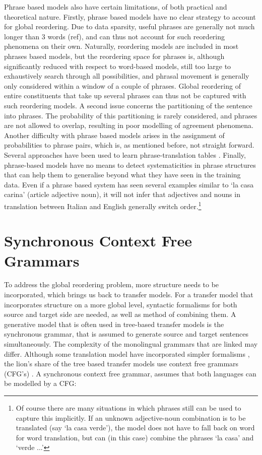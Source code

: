 \documentclass{report}
\theoremstyle{definition}
\theoremstyle{plain}
\begin{document}
Phrase based models also have certain limitations, of both practical and theoretical nature. Firstly, phrase based models have no clear strategy to account for global reordering. Due to data sparsity, useful phrases are generally not much longer than 3 words (ref), and can thus not account for such reordering phenomena on their own. Naturally, reordering models are included in most phrases based models, but the reordering space for phrases is, although significantly reduced with respect to word-based models, still too large to exhaustively search through all possibilities, and phrasal movement is generally only considered within a window of a couple of phrases. Global reordering of entire constituents that take up several phrases can thus not be captured with such reordering models. A second issue concerns the partitioning of the sentence into phrases. The probability of this partitioning is rarely considered, and phrases are not allowed to overlap, resulting in poor modelling of agreement phenomena. Another difficulty with phrase based models arises in the assignment of probabilities to phrase pairs, which is, as mentioned before, not straight forward. Several approaches have been used to learn phrase-translation tables \citep[see][p.130]{koehn2008statistical}. Finally, phrase-based models have no means to detect systematicities in phrase structures that can help them to generalise beyond what they have seen in the training data. Even if a phrase based system has seen several examples similar to `la casa carina' (article adjective noun), it will not infer that adjectives and nouns in translation between Italian and English generally switch order.\footnote{Of course there are many situations in which phrases still can be used to capture this implicitly. If an unknown adjective-noun combination is to be translated (say `la casa verde'), the model does not have to fall back on word for word translation, but can (in this case) combine the phrases `la casa' and `verde ...'}

\section{Synchronous Context Free Grammars}
\label{sec:SCFGs}

To address the global reordering problem, more structure needs to be incorporated, which brings us back to transfer models. For a transfer model that incorporates structure on a more global level, syntactic formalisms for both source and target side are needed, as well as method of combining them. A generative model that is often used in tree-based transfer models is the synchronous grammar, that is assumed to generate source and target sentences simultaneously. The complexity of the monolingual grammars that are linked may differ. Although some translation model have incorporated simpler formalisms \citep[e.g., finite state machines, in][]{alshawi2000learning}, the lion's share of the tree based transfer models use context free grammars (CFG's) \citep{chomsky1956three}. A synchronous context free grammar, assumes that both languages can be modelled by a CFG:
\end{document}
